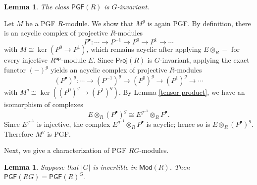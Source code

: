\documentclass[12pt,twoside]{amsart}
\theoremstyle{bfupright head,slanted body}
\theoremstyle{bfupright head,upright body}
\theoremstyle{fixed bf head,slanted body}
\newtheorem{lem}[res]{Lemma}            \newtheorem*{lem*}{Lemma}
\theoremstyle{fixed bf head,upright body}
\theoremstyle{numbered paragraph}
\newenvironment{prf*}[1][Proof]{%
  \begin{proof}[\bf #1]
    \setcounter{equation}{0}
    \renewcommand{\theequation}{\arabic{equation}}}
  {\end{proof}
}
\numberwithin{equation}{res}
\newcommand{\PGF}{\mathsf{PGF}}
\newcommand{\Proj}{\mathsf{Proj}}
\newcommand{\Mod}{\mathsf{Mod}}
\newcommand{\Rop}{R^{\sf op}}
\begin{document}
\begin{lem} \label{PGF G-invariant}
The class \(\PGF(R)\) is \(G\)-invariant.
\end{lem}

\begin{prf*}
Let \(M\) be a PGF \(R\)-module. We show that \(M^g\) is again PGF.
By definition, there is an acyclic complex of projective \(R\)-modules
\[
P^\bullet:\cdots\to P^{-1}\to P^0\to P^1\to\cdots
\]
with \(M\cong \ker(P^0\to P^1)\), which remains acyclic after applying \(E\otimes_R-\) for every injective \(\Rop\)-module \(E\).
Since \(\Proj(R)\) is \(G\)-invariant, applying the exact functor \((-)^g\) yields an acyclic complex of projective \(R\)-modules
\[
(P^\bullet)^g:\cdots\to (P^{-1})^g\to (P^0)^g\to (P^1)^g\to\cdots
\]
with \(M^g\cong \ker((P^0)^g\to(P^1)^g)\).
By Lemma \ref{tensor product}, we have an isomorphism of complexes
\[
E\otimes_R (P^\bullet)^g \cong E^{g^{-1}} \otimes_R P^\bullet.
\]
Since $E^{g^{-1}}$ is injective, the complex $E^{g^{-1}} \otimes_R P^\bullet$ is acyclic; hence so is $E\otimes_R(P^\bullet)^g$.
Therefore $M^g$ is PGF.
\end{prf*}


Next, we give a characterization of PGF \(RG\)-modules.

\begin{lem} \label{PGF equ}
Suppose that \(|G|\) is invertible in \(\Mod(R)\).
Then \(\PGF(RG)=\PGF(R)^G\).
\end{lem}
\end{document}
